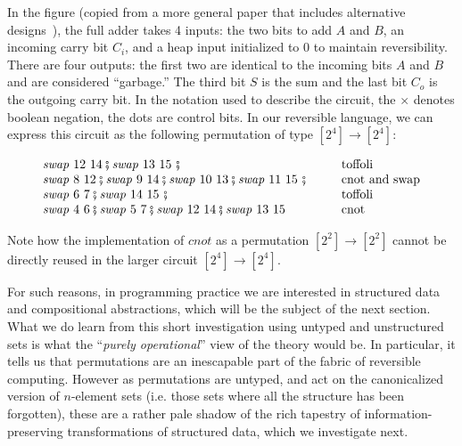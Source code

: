 \documentclass{article}
\begin{document}
In the figure (copied from a more general paper that includes
alternative designs~\cite{Rentergem2005OptimalDO}), the full adder
takes 4 inputs: the two bits to add $A$ and $B$, an incoming carry bit
$C_i$, and a heap input initialized to 0 to maintain
reversibility. There are four outputs: the first two are identical to
the incoming bits $A$ and $B$ and are considered ``garbage.'' The
third bit $S$ is the sum and the last bit $C_o$ is the outgoing carry
bit. In the notation used to describe the circuit, the $\times$ denotes
boolean negation, the dots are control bits. In our reversible
language, we can express this circuit as the following permutation of
type $[2^4] \rightarrow [2^4]$:

\begin{equation}\label{eq:adder}
\begin{array}{l@{\hspace{1cm}}l}
\mathit{swap}~12~14 \fatsemi \mathit{swap}~13~15 ~\fatsemi & \mbox{toffoli} \\
\mathit{swap}~8~12 \fatsemi \mathit{swap}~9~14 \fatsemi
    \mathit{swap}~10~13 \fatsemi \mathit{swap}~11~15 ~\fatsemi & \mbox{cnot and swap} \\
\mathit{swap}~6~7 \fatsemi \mathit{swap}~14~15 ~\fatsemi & \mbox{toffoli} \\
\mathit{swap}~4~6 \fatsemi \mathit{swap}~5~7 \fatsemi
    \mathit{swap}~12~14 \fatsemi \mathit{swap}~13~15 & \mbox{cnot}
\end{array}
\end{equation}

Note how the implementation of $\mathit{cnot}$ as a permutation
$[2^2] \rightarrow [2^2]$ cannot be directly reused in the larger
circuit $[2^4] \rightarrow [2^4]$.

For such reasons, in programming practice we are interested in
structured data and compositional abstractions, which will be the
subject of the next section. What we do learn from this short investigation
using untyped and unstructured sets is what the ``\emph{purely
  operational}'' view of the theory would be. In particular, it tells
us that permutations are an inescapable part of the fabric of
reversible computing.  However as permutations are untyped, and act on
the canonicalized version of $n$-element sets (i.e. those sets where
all the structure has been forgotten), these are a rather pale shadow
of the rich tapestry of information-preserving transformations of
structured data, which we investigate next.

\end{document}
